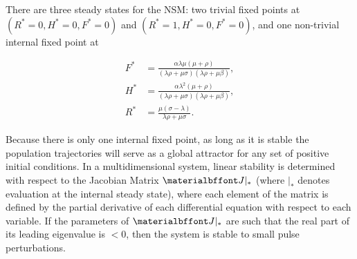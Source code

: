 \documentclass{pnastwo}
\begin{document}
\begin{article}


There are three steady states for the NSM: two trivial fixed points at $(R^*=0,H^*=0,F^*=0)$ and $(R^*=1,H^*=0,F^*=0)$, and one non-trivial internal fixed point at

\begin{equation}
\begin{aligned}
F^* &= \frac{\alpha  \lambda  \mu  (\mu +\rho )}{(\lambda  \rho +\mu  \sigma ) (\lambda  \rho +\mu  \beta)}, \\
H^* &= \frac{\alpha  \lambda ^2 (\mu +\rho )}{(\lambda  \rho +\mu  \sigma ) (\lambda  \rho +\mu  \beta)}, \\
R^* &= \frac{\mu  (\sigma -\lambda )}{\lambda  \rho +\mu  \sigma }.
\end{aligned}
\end{equation}



\noindent Because there is only one internal fixed point, as long as it is stable the population trajectories will serve as a global attractor for any set of positive initial conditions.
In a multidimensional system, linear stability is determined with respect to the Jacobian Matrix $\bf J|_*$ (where $|_*$ denotes evaluation at the internal steady state), where each element of the matrix is defined by the partial derivative of each differential equation with respect to each variable.
If the parameters of $\bf J|_*$ are such that the real part of its leading eigenvalue is $<0$, then the system is stable to small pulse perturbations. 



\end{article}
\end{document}
